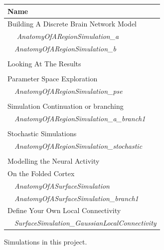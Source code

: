 \documentclass{tufte-handout}
\begin{document}
\begin{margintable}
  \centering
  \selectfont
  \begin{tabular}{l}
    \toprule
    Name \\
    \midrule
    \multicolumn{1}{l}{Building A Discrete Brain Network Model }\\
    $\quad$ \textit{AnatomyOfARegionSimulation\_a} \\
    $\quad$\textit{AnatomyOfARegionSimulation\_b}  \\ 
    \\
    \multicolumn{1}{l}{Looking At The Results}\\
    \\
    \multicolumn{1}{l}{Parameter Space Exploration}\\
     $\quad$\textit{AnatomyOfARegionSimulation\_pse} \\
    \\
    \multicolumn{1}{l}{Simulation Continuation or branching}\\
     $\quad$\textit{AnatomyOfARegionSimulation\_a\_branch1} \\
    \\
    \multicolumn{1}{l}{Stochastic Simulations}\\
     $\quad$\textit{AnatomyOfARegionSimulation\_stochastic}  \\
    \\
     \multicolumn{1}{l}{Modelling the Neural Activity}\\
     \multicolumn{1}{l}{On the Folded Cortex}\\
    $\quad$\textit{AnatomyOfASurfaceSimulation} \\
    $\quad$\textit{AnatomyOfASurfaceSimulation\_branch1}
    \\
    \multicolumn{1}{l}{Define Your Own Local Connectivity}\\
      $\quad$\textit{SurfaceSimulation\_GaussianLocalConnectivity} \\
    \bottomrule
  \end{tabular}
  \caption{Simulations in this project.}
  \label{tab:normaltab}
\end{margintable}
\end{document}
